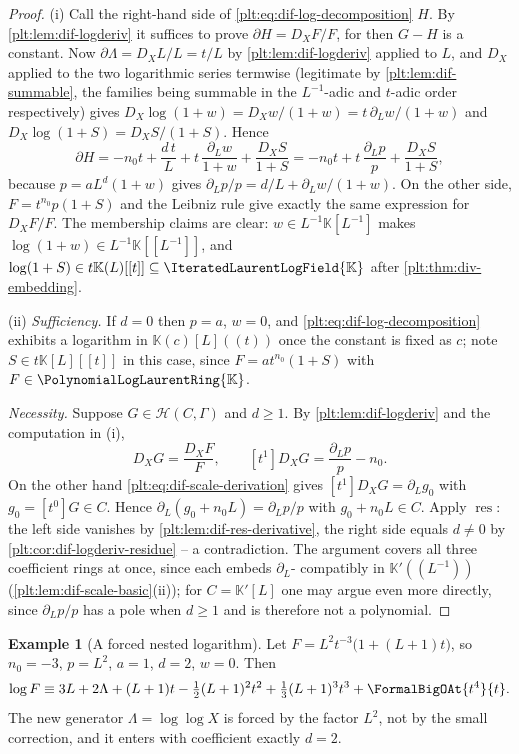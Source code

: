 \documentclass[11pt,oneside]{article}
\theoremstyle{plain}
\theoremstyle{definition}
\newtheorem{example}[theorem]{Example}
\theoremstyle{remark}
\newcommand{\K}{\mathbb{K}}
\newcommand{\PLlau}{\PolynomialLogLaurentRing{\K}}       %
\newcommand{\PLit}{\IteratedLaurentLogField{\K}}         %
\newcommand{\DX}{D_{X}}                                  %
\begin{document}
\begin{proof}
(i)  Call the right-hand side of \cref{plt:eq:dif-log-decomposition} \(H\).  By
\cref{plt:lem:dif-logderiv} it suffices to prove \(\partial H=\DX F/F\), for
then \(G-H\) is a constant.  Now \(\partial\Lambda=\DX L/L=t/L\) by
\cref{plt:lem:dif-logderiv} applied to \(L\), and \(\DX\) applied to the two
logarithmic series termwise (legitimate by
\cref{plt:lem:dif-summable}, the families being summable in the
\(L^{-1}\)-adic and \(t\)-adic order respectively) gives
\(\DX\log(1+w)=\DX w/(1+w)=t\,\partial_{L}w/(1+w)\) and
\(\DX\log(1+S)=\DX S/(1+S)\).  Hence
\[
  \partial H
  =-n_{0}t+\frac{d\,t}{L}
   +t\,\frac{\partial_{L}w}{1+w}
   +\frac{\DX S}{1+S}
  =-n_{0}t+t\,\frac{\partial_{L}p}{p}+\frac{\DX S}{1+S},
\]
because \(p=aL^{d}(1+w)\) gives \(\partial_{L}p/p=d/L+\partial_{L}w/(1+w)\).
On the other side, \(F=t^{n_{0}}p(1+S)\) and the Leibniz rule give exactly the
same expression for \(\DX F/F\).  The membership claims are clear:
\(w\in L^{-1}\K[L^{-1}]\) makes \(\log(1+w)\in L^{-1}\K[[L^{-1}]]\), and
\(\log(1+S)\in t\K(L)[[t]]\subseteq\PLit\) after
\cref{plt:thm:div-embedding}.

(ii)  \emph{Sufficiency.}  If \(d=0\) then \(p=a\), \(w=0\), and
\cref{plt:eq:dif-log-decomposition} exhibits a logarithm in \(\K(c)[L]((t))\)
once the constant is fixed as \(c\); note \(S\in t\K[L][[t]]\) in this case,
since \(F=at^{n_{0}}(1+S)\) with \(F\in\PLlau\).

\emph{Necessity.}  Suppose \(G\in\mathcal H(C,\Gamma)\) and \(d\ge1\).  By
\cref{plt:lem:dif-logderiv} and the computation in (i),
\[
  \DX G=\frac{\DX F}{F},
  \qquad
  [t^{1}]\DX G=\frac{\partial_{L}p}{p}-n_{0}.
\]
On the other hand \cref{plt:eq:dif-scale-derivation} gives \([t^{1}]\DX G
=\partial_{L}g_{0}\) with \(g_{0}=[t^{0}]G\in C\).  Hence
\(\partial_{L}(g_{0}+n_{0}L)=\partial_{L}p/p\) with \(g_{0}+n_{0}L\in C\).
Apply \(\operatorname{res}\): the left side vanishes by
\cref{plt:lem:dif-res-derivative}, the right side equals \(d\ne0\) by
\cref{plt:cor:dif-logderiv-residue} -- a contradiction.  The argument covers
all three coefficient rings at once, since each embeds \(\partial_{L}\)-
compatibly in \(\K'((L^{-1}))\) (\cref{plt:lem:dif-scale-basic}(ii)); for
\(C=\K'[L]\) one may argue even more directly, since
\(\partial_{L}p/p\) has a pole when \(d\ge1\) and is therefore not a
polynomial.
\end{proof}

\begin{example}[A forced nested logarithm]\label{plt:ex:dif-log-nested}
Let \(F=L^{2}t^{-3}\bigl(1+(L+1)t\bigr)\), so \(n_{0}=-3\), \(p=L^{2}\),
\(a=1\), \(d=2\), \(w=0\).  Then
\[
  \log F\equiv 3L+2\Lambda+(L+1)t-\tfrac12(L+1)^{2}t^{2}
  +\tfrac13(L+1)^{3}t^{3}+\FormalBigOAt{t^{4}}{t}.
\]
The new generator \(\Lambda=\log\log X\) is forced by the factor \(L^{2}\), not
by the small correction, and it enters with coefficient exactly
\(d=2\).
\end{example}
\end{document}
